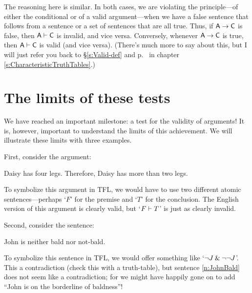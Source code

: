 The reasoning here is similar. In both cases, we are violating the principle---of either the conditional or of a valid argument---when we have a false sentence that follows from a sentence or a set of sentences that are all true. Thus, if $\mathsf{A} \rightarrow \mathsf{C}$ is false, then $\mathsf{A} \vdash \mathsf{C}$ is invalid, and vice versa. Conversely, whenever $\mathsf{A} \rightarrow \mathsf{C}$ is true, then $\mathsf{A} \vdash \mathsf{C}$ is valid (and vice versa). (There's much more to say about this, but I will just refer you back to  \S\ref{s:Valid-def} and p.~\pageref{characteristic-tt-conditional} in chapter \ref{s:CharacteristicTruthTables}.)


\section{The limits of these tests}\label{s:ParadoxesOfMaterialConditional}
We have reached an important milestone: a test for the validity of arguments! It is, however, important to understand the limits of this achievement. We will illustrate these limits with three examples.

First, consider the argument: 
	\begin{earg}
		\item Daisy has four legs. Therefore, Daisy has more than two legs.
	\end{earg}
To symbolize this argument in TFL, we would have to use two different atomic sentences---perhaps `$F$' for the premise  and `$T$' for the conclusion. The English version of this argument is clearly valid, but `$F \vdash T$' is just as clearly invalid. 

Second, consider the sentence:
	\begin{earg}
\setcounter{eargnum}{1}
		\item\label{n:JohnBald} John is neither bald nor not-bald.
	\end{earg}
To symbolize this sentence in TFL, we would offer something like `${\neg} J \mathbin{\&} {\neg} {\neg} J$'. This a contradiction (check this with a truth-table), but sentence \ref{n:JohnBald} does not seem like a contradiction; for we might have happily gone on to add ``John is on the borderline of baldness''!

